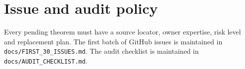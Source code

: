 \chapter{Issue and audit policy}

Every pending theorem must have a source locator, owner expertise, risk level and
replacement plan. The first batch of GitHub issues is maintained in
\texttt{docs/FIRST\_30\_ISSUES.md}. The audit checklist is maintained in
\texttt{docs/AUDIT\_CHECKLIST.md}.
